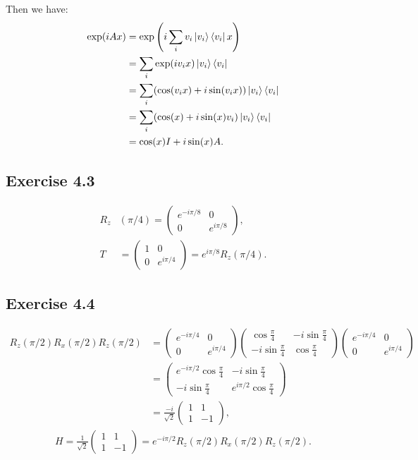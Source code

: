 Then we have:
\begin{align}
\exp(iAx)&=\exp\left(i\sum_i v_i \ket{v_i}\bra{v_i}x\right)\\
&=\sum_i \exp(iv_i x) \ket{v_i}\bra{v_i}\\
&=\sum_i(\cos(v_i x)+i\sin(v_i x))\ket{v_i}\bra{v_i}\\
&=\sum_i(\cos(x)+i\sin( x)v_i)\ket{v_i}\bra{v_i}\\
&=\cos(x)I+i\sin(x)A.
\end{align}

\subsection*{Exercise 4.3}

\begin{align}
    R_z&(\pi/4)=\begin{pmatrix}e^{-i\pi/8} & 0 \\0 & e^{i\pi/8} \end{pmatrix},\\
    T&=\begin{pmatrix}1 & 0 \\0 & e^{i\pi/4} \end{pmatrix}=e^{i\pi/8}R_z(\pi/4).
\end{align}

\subsection*{Exercise 4.4}
\begin{align}
    R_z(\pi/2)R_x(\pi/2)R_z(\pi/2)&=
    \begin{pmatrix}e^{-i\pi/4} & 0 \\0 & e^{i\pi/4}\end{pmatrix}
    \begin{pmatrix}\cos \frac{\pi}{4}& -i\sin\frac{\pi}{4} \\ -i\sin\frac{\pi}{4} & \cos \frac{\pi}{4}\end{pmatrix}
    \begin{pmatrix}e^{-i\pi/4} & 0 \\0 & e^{i\pi/4}\end{pmatrix}\\
    &= \begin{pmatrix}e^{-i\pi/2}\cos \frac{\pi}{4}& -i\sin\frac{\pi}{4} \\ -i\sin\frac{\pi}{4} & e^{i\pi/2}\cos \frac{\pi}{4}\end{pmatrix}\\
    &= \frac{-i}{\sqrt 2}\begin{pmatrix}
    1&1\\1&-1
    \end{pmatrix},
\end{align}
\begin{align}
    H=\frac{1}{\sqrt 2}\begin{pmatrix}
    1&1\\1&-1
    \end{pmatrix}
    =e^{-i\pi/2} R_z(\pi/2)R_x(\pi/2)R_z(\pi/2).
\end{align}

